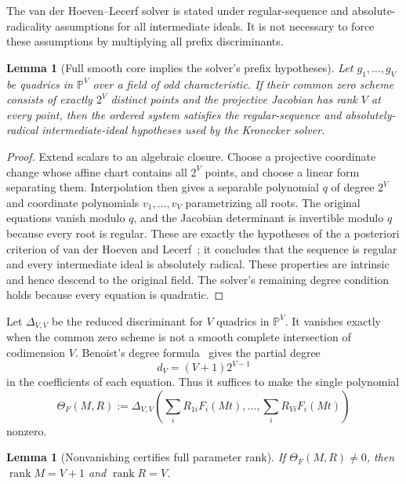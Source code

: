 \documentclass[10pt,a4paper]{article}
\newtheorem{lemma}[theorem]{Lemma}
\newcommand{\PP}{\mathbb P}
\newcommand{\rank}{\operatorname{rank}}
\begin{document}
The van der Hoeven--Lecerf solver is stated under regular-sequence and absolute-radicality assumptions for all intermediate ideals.  It is not necessary to force these assumptions by multiplying all prefix discriminants.

\begin{lemma}[Full smooth core implies the solver's prefix hypotheses]\label{lem:full-implies-prefix}
Let $g_1,\ldots,g_V$ be quadrics in $\PP^V$ over a field of odd characteristic.  If their common zero scheme consists of exactly $2^V$ distinct points and the projective Jacobian has rank $V$ at every point, then the ordered system satisfies the regular-sequence and absolutely-radical intermediate-ideal hypotheses used by the Kronecker solver.
\end{lemma}

\begin{proof}
Extend scalars to an algebraic closure.  Choose a projective coordinate change whose affine chart contains all $2^V$ points, and choose a linear form separating them.  Interpolation then gives a separable polynomial $q$ of degree $2^V$ and coordinate polynomials $v_1,\ldots,v_V$ parametrizing all roots.  The original equations vanish modulo $q$, and the Jacobian determinant is invertible modulo $q$ because every root is regular.  These are exactly the hypotheses of the a posteriori criterion of van der Hoeven and Lecerf~\cite[Proposition~4.6]{vdHL}; it concludes that the sequence is regular and every intermediate ideal is absolutely radical.  These properties are intrinsic and hence descend to the original field.  The solver's remaining degree condition holds because every equation is quadratic.
\end{proof}

Let $\Delta_{V,V}$ be the reduced discriminant for $V$ quadrics in $\PP^V$.  It vanishes exactly when the common zero scheme is not a smooth complete intersection of codimension $V$.  Benoist's degree formula~\cite{Benoist} gives the partial degree
\begin{equation}\label{eq:dpartial}
d_V=(V+1)2^{V-1}
\end{equation}
in the coefficients of each equation.  Thus it suffices to make the single polynomial
\begin{equation}\label{eq:theta}
\Theta_F(M,R):=
\Delta_{V,V}\!\left(
\sum_iR_{1i}F_i(Mt),\ldots,
\sum_iR_{Vi}F_i(Mt)
\right)
\end{equation}
nonzero.

\begin{lemma}[Nonvanishing certifies full parameter rank]\label{lem:theta-ranks}
If $\Theta_F(M,R)\ne0$, then $\rank M=V+1$ and $\rank R=V$.
\end{lemma}
\end{document}
